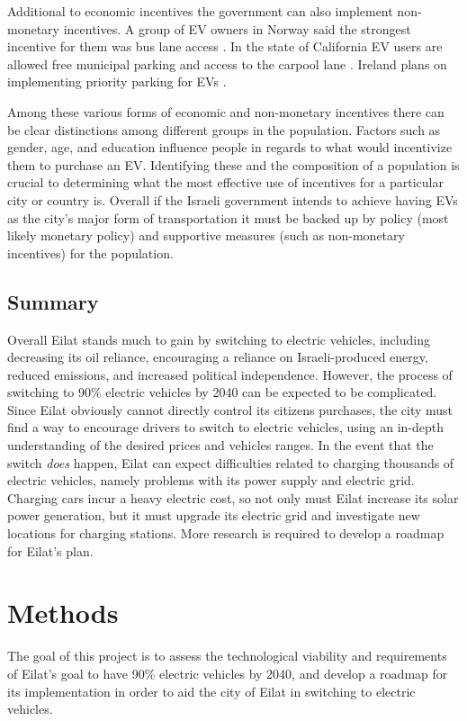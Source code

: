 \documentclass{article}                         %
\begin{document}
Additional to economic incentives the government can also implement non-monetary incentives. A group of EV owners in Norway said the strongest incentive for them was bus lane access \cite{Bjerkan2016IncentivesNorway}. In the state of California EV users are allowed free municipal parking and access to the carpool lane \cite{TeslaElectricIncentives}. Ireland plans on implementing priority parking for EVs \cite{SustainableEnergyAuthorityofIreland2011ElectricRoadmap}.

Among these various forms of economic and non-monetary incentives there can be clear distinctions among different groups in the population. Factors such as gender, age, and education influence people in regards to what would incentivize them to purchase an EV. Identifying these and the composition of a population is crucial to determining what the most effective use of incentives for a particular city or country is. Overall if the Israeli government intends to achieve having EVs as the city's major form of transportation it must be backed up by policy (most likely monetary policy) and supportive measures (such as non-monetary incentives) for the population.

\subsection{Summary}
Overall Eilat stands much to gain by switching to electric vehicles, including decreasing its oil reliance, encouraging a reliance on Israeli-produced energy, reduced emissions, and increased political independence. However, the process of switching to 90\% electric vehicles by 2040 can be expected to be complicated. Since Eilat obviously cannot directly control its citizens purchases, the city must find a way to encourage drivers to switch to electric vehicles, using an in-depth understanding of the desired prices and vehicles ranges. In the event that the switch \textit{does} happen, Eilat can expect difficulties related to charging thousands of electric vehicles, namely problems with its power supply and electric grid. Charging cars incur a heavy electric cost, so not only must Eilat increase its solar power generation, but it must upgrade its electric grid and investigate new locations for charging stations. More research is required to develop a roadmap for Eilat's plan.

\newpage
\section{Methods}
The goal of this project is to assess the technological viability and requirements of Eilat's goal to have 90\% electric vehicles by 2040, and develop a roadmap for its implementation in order to aid the city of Eilat in switching to electric vehicles.
\end{document}
